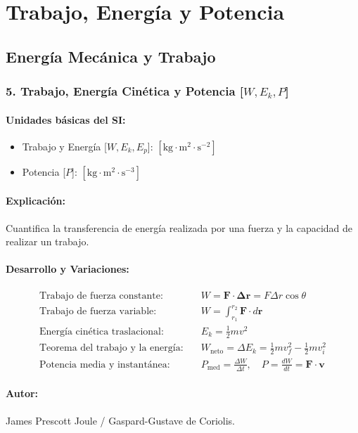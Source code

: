\documentclass[12pt,a4paper]{article}
\begin{document}
\section{Trabajo, Energía y Potencia}

\subsection{Energía Mecánica y Trabajo}

\subsubsection*{5. Trabajo, Energía Cinética y Potencia [$W, E_k, P$]}
\paragraph*{Unidades básicas del SI:}
\begin{itemize}
    \item Trabajo y Energía [$W, E_k, E_p$]: $[\text{kg}\cdot\text{m}^2\cdot\text{s}^{-2}]$
    \item Potencia [$P$]: $[\text{kg}\cdot\text{m}^2\cdot\text{s}^{-3}]$
\end{itemize}
\paragraph*{Explicación:} Cuantifica la transferencia de energía realizada por una fuerza y la capacidad de realizar un trabajo.
\paragraph*{Desarrollo y Variaciones:}
\begin{align*}
\text{Trabajo de fuerza constante:} \quad & W = \mathbf{F} \cdot \mathbf{\Delta r} = F \Delta r \cos\theta \\
\text{Trabajo de fuerza variable:} \quad & W = \int_{r_1}^{r_2} \mathbf{F} \cdot d\mathbf{r} \\
\text{Energía cinética traslacional:} \quad & E_k = \frac{1}{2} m v^2 \\
\text{Teorema del trabajo y la energía:} \quad & W_{\text{neto}} = \Delta E_k = \frac{1}{2} m v_f^2 - \frac{1}{2} m v_i^2 \\
\text{Potencia media y instantánea:} \quad & P_{\text{med}} = \frac{\Delta W}{\Delta t}, \quad P = \frac{dW}{dt} = \mathbf{F} \cdot \mathbf{v}
\end{align*}
\paragraph*{Autor:} James Prescott Joule / Gaspard-Gustave de Coriolis.
\end{document}
